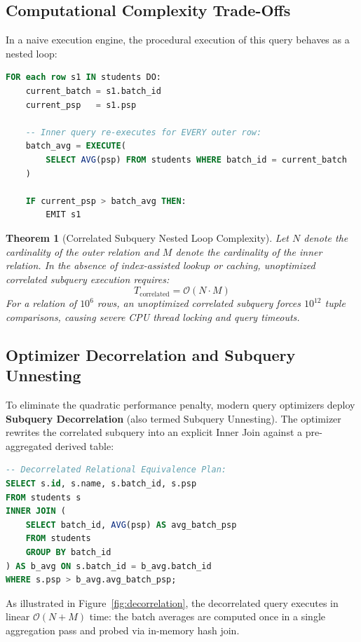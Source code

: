 \documentclass[10pt,twocolumn,letterpaper]{article}
\newtheorem{theorem}{Theorem}
\begin{document}
\subsection{Computational Complexity Trade-Offs}
In a naive execution engine, the procedural execution of this query behaves as a nested loop:
\begin{lstlisting}[language=SQL]
FOR each row s1 IN students DO:
    current_batch = s1.batch_id
    current_psp   = s1.psp
    
    -- Inner query re-executes for EVERY outer row:
    batch_avg = EXECUTE(
        SELECT AVG(psp) FROM students WHERE batch_id = current_batch
    )
    
    IF current_psp > batch_avg THEN:
        EMIT s1
\end{lstlisting}
\begin{theorem}[Correlated Subquery Nested Loop Complexity]
Let $N$ denote the cardinality of the outer relation and $M$ denote the cardinality of the inner relation. In the absence of index-assisted lookup or caching, unoptimized correlated subquery execution requires:
\begin{equation}
T_{\text{correlated}} = \mathcal{O}(N \cdot M)
\end{equation}
For a relation of $10^6$ rows, an unoptimized correlated subquery forces $10^{12}$ tuple comparisons, causing severe CPU thread locking and query timeouts.
\end{theorem}

\subsection{Optimizer Decorrelation and Subquery Unnesting}
To eliminate the quadratic performance penalty, modern query optimizers deploy \textbf{Subquery Decorrelation} (also termed Subquery Unnesting). The optimizer rewrites the correlated subquery into an explicit Inner Join against a pre-aggregated derived table:

\begin{lstlisting}[language=SQL]
-- Decorrelated Relational Equivalence Plan:
SELECT s.id, s.name, s.batch_id, s.psp
FROM students s
INNER JOIN (
    SELECT batch_id, AVG(psp) AS avg_batch_psp
    FROM students
    GROUP BY batch_id
) AS b_avg ON s.batch_id = b_avg.batch_id
WHERE s.psp > b_avg.avg_batch_psp;
\end{lstlisting}

As illustrated in Figure~\ref{fig:decorrelation}, the decorrelated query executes in linear $\mathcal{O}(N + M)$ time: the batch averages are computed once in a single aggregation pass and probed via in-memory hash join.
\end{document}
